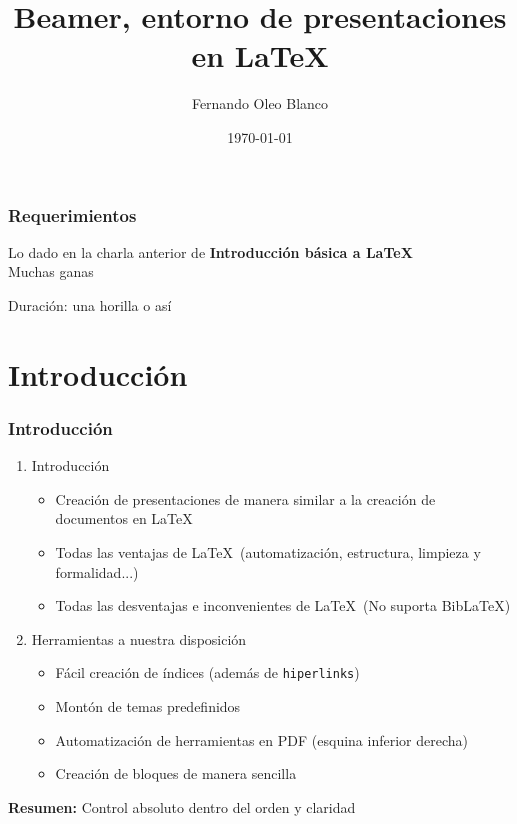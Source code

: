 \documentclass{beamer}
\title[\LaTeXe]{Beamer, entorno de presentaciones en \LaTeX} %
\author{Fernando Oleo Blanco} %
\institute[ICAI] %
{
Universidad ICAI Comillas \\ %
Asociación de LinuxEC \\
\medskip
\textit{201507027@alu.comillas.edu} %
}
\date{\today} %
\begin{document}
\begin{frame}
\titlepage %
\end{frame}

\begin{frame}
\frametitle{Requerimientos}
Lo dado en la charla anterior de \textbf{Introducción básica a \LaTeX} \\
Muchas ganas
\end{frame}

\begin{frame}
	Duración: una horilla o así
\end{frame}

\begin{frame}
	\tableofcontents[pausesections]
\end{frame}


\section{Introducción} %

\begin{frame}[c]
	\frametitle{Introducción}
	\begin{enumerate}
		\item Introducción
		\begin{itemize}
			\item Creación de presentaciones de manera similar a la creación de documentos en \LaTeX
			\item Todas las ventajas de \LaTeX\ (automatización, estructura, limpieza y formalidad...)
			\item Todas las desventajas e inconvenientes de \LaTeX\ (No suporta Bib\LaTeX)
		\end{itemize}
		\item Herramientas a nuestra disposición
		\begin{itemize}
			\item Fácil creación de índices (además de \texttt{hiperlinks})
			\item Montón de temas predefinidos
			\item Automatización de herramientas en PDF (esquina inferior derecha)
			\item Creación de bloques de manera sencilla
		\end{itemize}
	\end{enumerate}
	\textbf{Resumen:} Control absoluto dentro del orden y claridad 
\end{frame}
\end{document}
